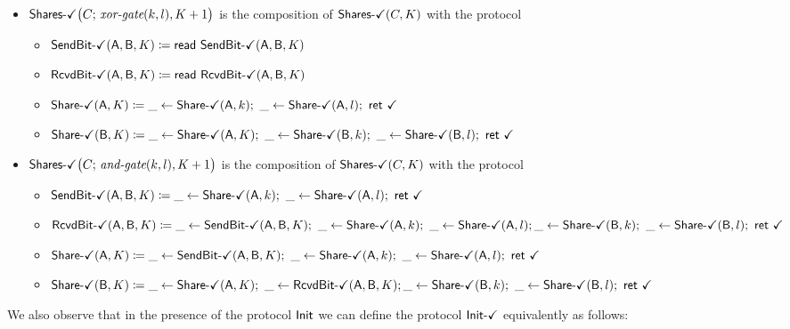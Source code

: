 \begin{itemize}
\item $\SharesOk\big(C; \, \xorgate(k,l),K+1\big)$ is the composition of $\SharesOk(C,K)$ with the protocol
\begin{itemize}
\item {\color{teal} $\SendBitOk(\A,\B,K) \coloneqq \read{\SendBitOk(\A,\B,K)}$}
\item {\color{teal} $\RcvdBitOk(\A,\B,K) \coloneqq \read{\RcvdBitOk(\A,\B,K)}$}
\item {\color{teal} $\ShareOk(\A,K) \coloneqq \_ \leftarrow \ShareOk(\A,k); \ \_ \leftarrow \ShareOk(\A,l); \ \ret{\checkmark}$}
\item {\color{teal} $\ShareOk(\B,K) \coloneqq \_ \leftarrow \ShareOk(\A,K); \ \_ \leftarrow \ShareOk(\B,k); \ \_ \leftarrow \ShareOk(\B,l); \ \ret{\checkmark}$}
\end{itemize}

\item $\SharesOk\big(C; \, \andgate(k,l),K+1\big)$ is the composition of $\SharesOk(C,K)$ with the protocol
\begin{itemize}
\item {\color{teal} $\SendBitOk(\A,\B,K) \coloneqq \_ \leftarrow \ShareOk(\A,k); \ \_ \leftarrow \ShareOk(\A,l); \ \ret{\checkmark}$}
\item {\color{teal} $\RcvdBitOk(\A,\B,K) \coloneqq \_ \leftarrow \SendBitOk(\A,\B,K); \ \_ \leftarrow \ShareOk(\A,k); \ \_ \leftarrow \ShareOk(\A,l); \\ \_ \leftarrow \ShareOk(\B,k); \ \_ \leftarrow \ShareOk(\B,l); \ \ret{\checkmark}$}
\item {\color{teal} $\ShareOk(\A,K) \coloneqq \_ \leftarrow \SendBitOk(\A,\B,K); \ \_ \leftarrow \ShareOk(\A,k); \ \_ \leftarrow \ShareOk(\A,l); \ \ret{\checkmark}$}
\item {\color{teal} $\ShareOk(\B,K) \coloneqq \_ \leftarrow \ShareOk(\A,K); \ \_ \leftarrow \RcvdBitOk(\A,\B,K); \\ \_ \leftarrow \ShareOk(\B,k); \ \_ \leftarrow \ShareOk(\B,l); \ \ret{\checkmark}$}
\end{itemize}
\end{itemize}

\noindent We also observe that in the presence of the protocol $\Init$ we can define the protocol $\InitOk$ equivalently as follows:

